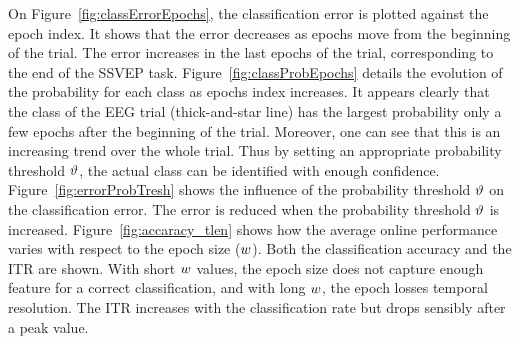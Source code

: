 On Figure~\ref{fig:classErrorEpochs}, the classification error is plotted against the epoch index. 
It shows that the error decreases as epochs move from the beginning of the trial.
The error increases in the last epochs of the trial, corresponding to the end of the SSVEP task.  
Figure~\ref{fig:classProbEpochs} details the evolution of the probability for each class as epochs index increases. 
It appears clearly that the class of the EEG trial (thick-and-star line) has the largest probability only a few epochs after the beginning of the trial. 
Moreover, one can see that this is an increasing trend over the whole trial. 
Thus by setting an appropriate probability threshold $\vartheta$, the actual class can be identified with enough confidence.  
Figure~\ref{fig:errorProbTresh} shows the influence of the probability threshold $\vartheta$ on the classification error. 
The error is reduced when the probability threshold $\vartheta$ is increased. 
Figure~\ref{fig:accaracy_tlen} shows how the average online performance varies with respect to the epoch size ($w$).
Both the classification accuracy and the ITR are shown. 
With short $w$ values, the epoch size does not capture enough feature for a correct classification, and with long $w$, the epoch losses temporal resolution.
The ITR increases with the classification rate but drops sensibly after a peak value. 

